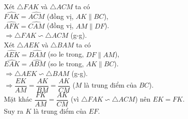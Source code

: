 \begin{bt}
{\begin{enumerate}
{
			}
			Xét $\triangle FAK$ và $\triangle ACM$ ta có\\
			$\widehat{FAK}=\widehat{ACM}$ (đồng vị, $AK\parallel BC$),\\
			$\widehat{AFK}=\widehat{CAM}$ (đồng vị, $AM\parallel DF$).\\
			$\Rightarrow \triangle FAK \backsim \triangle ACM$ (g-g).\\
			Xét $\triangle AEK$ và $\triangle BAM$ ta có\\
			$\widehat{AEK}=\widehat{BAM}$ (so le trong, $DF\parallel AM$),\\
			$\widehat{EAK}=\widehat{ABM}$ (so le trong, $AK\parallel BC$).\\
			$\Rightarrow \triangle AEK \backsim \triangle BAM$ (g-g).\\
			$\Rightarrow \dfrac{EK}{AM}=\dfrac{AK}{BM}=\dfrac{AK}{CM}$ ($M$ là trung điểm của $BC$).\\
			Mặt khác $\dfrac{FK}{AM}=\dfrac{AK}{CM}$ (vì $\triangle FAK \backsim \triangle ACM$) nên $EK=FK$.\\
			Suy ra $K$ là trung điểm của $EF$.	
		\end{enumerate}
	}
\end{bt}
